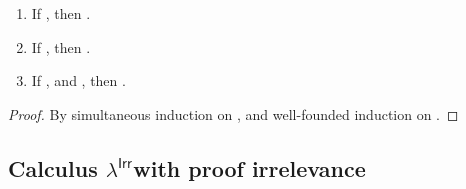 \documentclass{LMCS}
\newcommand{\lambdaPI}{\texorpdfstring{\ensuremath{\lambda^{\mathsf{Irr}}}}{Proof-irrelevance}}
\newcommand{\enumrule}[2][n]{n\ensuremath{_{#1}}-{#2}}
\newcommand{\LONGVERSION}[1]{}
\newcommand{\SHORTVERSION}[1]{#1}
\newcommand{\LONGSHORT}[2]{\LONGVERSION{#1}\SHORTVERSION{#2}}
\newcommand{\PrfIrrTitle}{\subsection{Calculus \lambdaPI with proof irrelevance}}
\newcommand{\para}[1]{
\LONGSHORT{\paragraph{\it #1.}}
          {\vspace{1ex}\noindent{\it #1.}}
}
\begin{document}
  \begin{thm}\hfill
    \label{thm:compl-tc}
    \begin{enumerate}[\em(1)]
    \item If , then .
    \item If , then
      .
    \item If , and ,
      then .
    \end{enumerate}
  \end{thm}
\LONGSHORT{
  \begin{proof}
    We prove these three statements simultaneously by well-founded
    induction on the order .  The respective measures are (1)
    , (2) , and (3) .
    Details are in the Appendix~\ref{prf:compl-tc}.
\end{proof}
}
{
  \begin{proof}
    By simultaneous induction on , and well-founded induction on
    .
  \end{proof}
}




\PrfIrrTitle

\LONGSHORT{

  We give additional rules for type-checking and type-inference
  algorithms for the constructs added in
  Sect.~\ref{sec:pi-calc}. Remember that we distinguished two calculi:
  the calculus  has rules (\textsc{\enumrule[0]tm}) and
  (\textsc{prf-tm}); while  lacks those rules.





}{
}

\begin{defi}
  \label{alg:nat-tc}

\LONGSHORT{
\renewcommand{\para}[1]{\noindent #1.} 

\para{-types}



\para{Natural numbers}


\para{Finite types}
  

\para{Proof types}
  

}{  

}
\end{defi}\medskip
\end{document}
